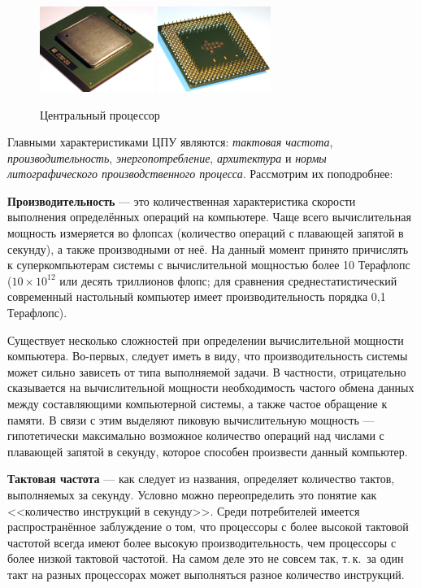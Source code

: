 \begin{figure}[h!]
 \centering
 \includegraphics[width=0.33\textwidth]{base/Introduction/CPUup.jpg}
 \includegraphics[width=0.33\textwidth]{base/Introduction/CPUdown.jpg}
 \label{base:introduction:components:cpu:cpupic}
 \caption{Центральный процессор}
\end{figure}

Главными характеристиками ЦПУ являются: \emph{тактовая частота}, \emph{производительность}, \emph{энергопотребление}, \emph{архитектура} и \emph{нормы литографического производственного процесса}. Рассмотрим их поподробнее:

\textbf{Производительность} --- это количественная характеристика скорости выполнения определённых операций на компьютере.
Чаще всего вычислительная мощность измеряется во флопсах (количество операций с плавающей запятой в секунду), а также производными от неё.
На данный момент принято причислять к суперкомпьютерам системы с вычислительной мощностью более 10 Терафлопс ($10\times10^{12}$ или десять триллионов флопс; для сравнения среднестатистический современный настольный компьютер имеет производительность порядка 0,1 Терафлопс).

Существует несколько сложностей при определении вычислительной мощности компьютера.
Во-первых, следует иметь в виду, что производительность системы может сильно зависеть от типа выполняемой задачи.
В частности, отрицательно сказывается на вычислительной мощности необходимость частого обмена данных между составляющими компьютерной системы, а также частое обращение к памяти.
В связи с этим выделяют пиковую вычислительную мощность --- гипотетически максимально возможное количество операций над числами с плавающей запятой в секунду, которое способен произвести данный компьютер.

\textbf{Тактовая частота} --- как следует из названия, определяет количество тактов, выполняемых за секунду. Условно можно переопределить это понятие как <<количество инструкций в секунду>>.
Среди потребителей имеется распространённое заблуждение о том, что процессоры с более высокой тактовой частотой всегда имеют более высокую производительность, чем процессоры с более низкой тактовой частотой.
На самом деле это не совсем так, т.\,к.~за один такт на разных процессорах может выполняться разное количество инструкций.

